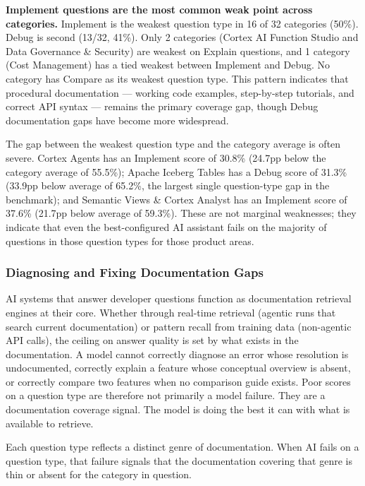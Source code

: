 \documentclass[10pt,letterpaper]{article}
\begin{document}
\textbf{Implement questions are the most common weak point across categories.} Implement is the weakest question type in 16 of 32 categories (50\%). Debug is second (13/32, 41\%). Only 2 categories (Cortex AI Function Studio and Data Governance \& Security) are weakest on Explain questions, and 1 category (Cost Management) has a tied weakest between Implement and Debug. No category has Compare as its weakest question type. This pattern indicates that procedural documentation --- working code examples, step-by-step tutorials, and correct API syntax --- remains the primary coverage gap, though Debug documentation gaps have become more widespread.

The gap between the weakest question type and the category average is often severe. Cortex Agents has an Implement score of 30.8\% (24.7pp below the category average of 55.5\%); Apache Iceberg Tables has a Debug score of 31.3\% (33.9pp below average of 65.2\%, the largest single question-type gap in the benchmark); and Semantic Views \& Cortex Analyst has an Implement score of 37.6\% (21.7pp below average of 59.3\%). These are not marginal weaknesses; they indicate that even the best-configured AI assistant fails on the majority of questions in those question types for those product areas.

\subsubsection{Diagnosing and Fixing Documentation Gaps}
\label{sec:diagnosing_fixing_gaps}

AI systems that answer developer questions function as documentation retrieval engines at their core. Whether through real-time retrieval (agentic runs that search current documentation) or pattern recall from training data (non-agentic API calls), the ceiling on answer quality is set by what exists in the documentation. A model cannot correctly diagnose an error whose resolution is undocumented, correctly explain a feature whose conceptual overview is absent, or correctly compare two features when no comparison guide exists. Poor scores on a question type are therefore not primarily a model failure. They are a documentation coverage signal. The model is doing the best it can with what is available to retrieve.

Each question type reflects a distinct genre of documentation. When AI fails on a question type, that failure signals that the documentation covering that genre is thin or absent for the category in question.
\end{document}

